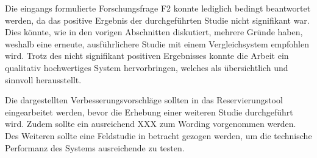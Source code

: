 Die eingangs formulierte Forschungsfrage F2 konnte lediglich bedingt beantwortet werden, da das
positive Ergebnis der durchgeführten Studie nicht signifikant war. Dies könnte, wie in den
vorigen Abschnitten diskutiert, mehrere Gründe haben, weshalb eine erneute, ausführlichere
Studie mit einem Vergleichsystem empfohlen wird. Trotz des nicht
signifikant positiven Ergebnisses konnte die Arbeit ein qualitativ hochwertiges System
hervorbringen, welches als übersichtlich und sinnvoll herausstellt.

Die dargestellten Verbesserungsvorschläge sollten in das Reservierungstool eingearbeitet werden,
bevor die Erhebung einer weiteren Studie durchgeführt wird. Zudem sollte ein ausreichend
XXX zum Wording vorgenommen werden. Des Weiteren sollte eine Feldstudie in betracht gezogen werden,
um die technische Performanz des Systems ausreichende zu testen.